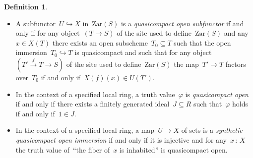 \documentclass[10pt,reqno,a4paper]{amsbook}
\theoremstyle{definition}
\newtheorem{defn}{Definition}[section]
\theoremstyle{plain}
\theoremstyle{remark}
\newcommand{\Zar}{\mathrm{Zar}}
\newcommand{\?}{\,{:}\,}
\renewcommand{\_}{\mathpunct{.}\,}
\newcommand{\xra}{\xrightarrow}
\begin{document}
\begin{defn}\begin{itemize}
\item A subfunctor~$U \hookrightarrow X$ in~$\Zar(S)$ is a \emph{quasicompact open subfunctor} if
and only if for any object~$(T \to S)$ of the site used to define~$\Zar(S)$
and any~$x \in X(T)$ there exists an open subscheme~$T_0 \subseteq T$
such that the open immersion~$T_0 \hookrightarrow T$ is quasicompact and such
that for any object~$(T' \xra{f} T \to S)$ of the site used to define~$\Zar(S)$
the map~$T' \to T$ factors over~$T_0$ if and only if~$X(f)(x) \in U(T')$.
\item In the context of a specified local ring, a truth value~$\varphi$ is
\emph{quasicompact open} if and only if there exists a finitely generated
ideal~$J \subseteq R$ such that~$\varphi$ holds if and only if~$1 \in
J$.
\item In the context of a specified local ring, a map~$U \to X$ of sets is a
\emph{synthetic quasicompact open immersion} if and only if it is injective and for any~$x\?X$
the truth value of~``the fiber of~$x$ is inhabited'' is quasicompact open.
\end{itemize}
\end{defn}
\end{document}
